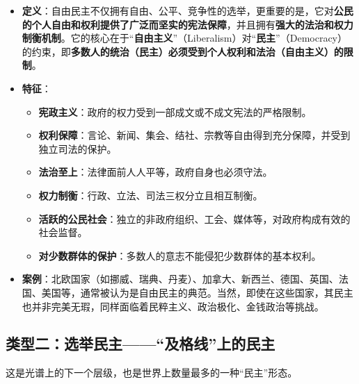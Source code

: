 \begin{itemize}
    \item \textbf{定义}：自由民主不仅拥有自由、公平、竞争性的选举，更重要的是，它对\textbf{公民的个人自由和权利提供了广泛而坚实的宪法保障}，并且拥有\textbf{强大的法治和权力制衡机制}。它的核心在于“\textbf{自由主义}”（Liberalism）对“\textbf{民主}”（Democracy）的约束，即\textbf{多数人的统治（民主）必须受到个人权利和法治（自由主义）的限制}。
    \item \textbf{特征}：
    \begin{itemize}
        \item \textbf{宪政主义}：政府的权力受到一部成文或不成文宪法的严格限制。
        \item \textbf{权利保障}：言论、新闻、集会、结社、宗教等自由得到充分保障，并受到独立司法的保护。
        \item \textbf{法治至上}：法律面前人人平等，政府自身也必须守法。
        \item \textbf{权力制衡}：行政、立法、司法三权分立且相互制衡。
        \item \textbf{活跃的公民社会}：独立的非政府组织、工会、媒体等，对政府构成有效的社会监督。
        \item \textbf{对少数群体的保护}：多数人的意志不能侵犯少数群体的基本权利。
    \end{itemize}
    \item \textbf{案例}：北欧国家（如挪威、瑞典、丹麦）、加拿大、新西兰、德国、英国、法国、美国等，通常被认为是自由民主的典范。当然，即使在这些国家，其民主也并非完美无瑕，同样面临着民粹主义、政治极化、金钱政治等挑战。
\end{itemize}

\subsection{类型二：选举民主——“及格线”上的民主}

这是光谱上的下一个层级，也是世界上数量最多的一种“民主”形态。

